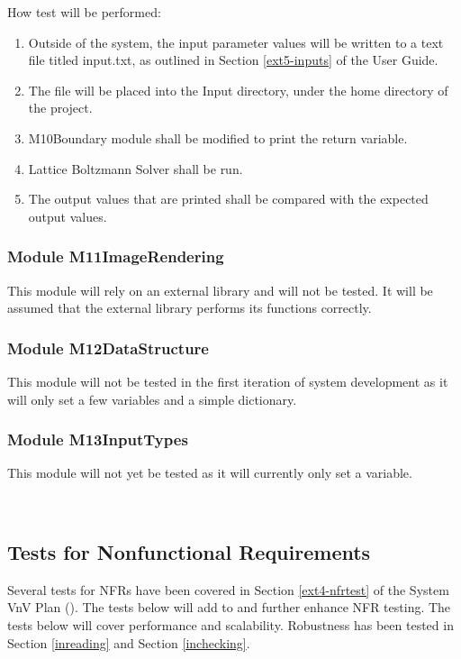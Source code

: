 \documentclass[12pt, titlepage]{article}
\newcommand{\myprogname}{Lattice Boltzmann Solver}
\begin{document}
\begin{enumerate}
	How test will be performed: 
	\begin{enumerate}
	\item Outside of the system, the input parameter values will be written to a text file titled input.txt, as outlined in Section \ref{ext5-inputs} of the User Guide.
	\item The file will be placed into the Input directory, under the home directory of the project.
	\item M10Boundary module shall be modified to print the return variable.
	\item {\myprogname} shall be run. 
	\item The output values that are printed shall be compared with the expected output values.
	\end{enumerate}

\end{enumerate}

\subsubsection{Module M11ImageRendering}

This module will rely on an external library and will not be tested. It will be assumed that the external library performs its functions correctly.

\subsubsection{Module M12DataStructure}

This module will not be tested in the first iteration of system development as it will only set a few variables and a simple dictionary.

\subsubsection{Module M13InputTypes}

This module will not yet be tested as it will currently only set a variable.


~\newpage

\subsection{Tests for Nonfunctional Requirements}

Several tests for NFRs have been covered in Section \ref{ext4-nfrtest} of the System VnV Plan (\citet{LBM_SVNV_PM}). The tests below will add to and further enhance NFR testing. The tests below will cover performance and scalability. Robustness has been tested in Section \ref{inreading} and Section \ref{inchecking}.
\end{document}
